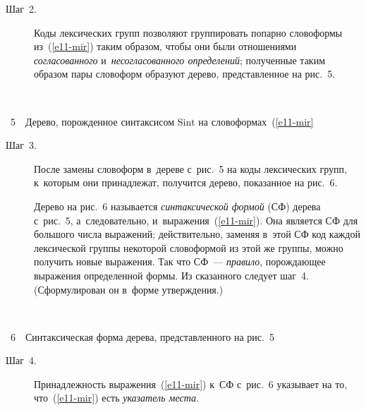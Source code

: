 \begin{multicols}{2}
\begin{description}
     

     
    \item[Шаг~2.] Коды лексических групп позволяют группировать попарно 
словоформы из~(\ref{e11-mir}) таким образом, чтобы они были отношениями 
\textit{согласованного} и~\textit{несогласованного определений}; полученные таким 
образом пары словоформ образуют дерево, представленное на рис.~5.
\end{description}

{ \begin{center}  %
 \vspace*{9pt}
  \mbox{%
 \epsfxsize=68.512mm 
 }


\end{center}


\noindent
{{\figurename~5}\ \ \small{Дерево, порожденное синтаксисом $\mathrm{Sint}$ на словоформах~(\ref{e11-mir}}}
}

\vspace*{9pt}      

     
     
     
 \begin{description}    
     \item[Шаг~3.] После замены словоформ в~дереве с~рис.~5 на коды лексических 
групп, к~которым они принадлежат, получится дерево, показанное на рис.~6.
     

     
     Дерево на рис.~6 называется \textit{синтаксической формой} (СФ) дерева 
с~рис.~5, а~следовательно, и~выражения~(\ref{e11-mir}). Она является СФ для 
большого чис\-ла выражений; действительно, заменяя в~этой СФ код каждой 
лексической группы некоторой словоформой из этой же группы, можно получить 
новые выражения. Так что СФ~--- \textit{правило}, порождающее выражения 
определенной формы. Из сказанного следует шаг~4. (Сформулирован он в~форме 
утверж\-де\-ния.) 
\end{description}

{ \begin{center}  %
 \vspace*{9pt}
  \mbox{%
 \epsfxsize=68.512mm 
 }


\end{center}


\noindent
{{\figurename~6}\ \ \small{Синтаксическая форма дерева, представленного на рис.~5}}
}
    
    \vspace*{6pt}
     
     
\begin{description}
     \item[Шаг~4.] При\-над\-леж\-ность выражения~(\ref{e11-mir}) к~СФ с~рис.~6 
указывает на то, что~(\ref{e11-mir}) есть \textit{указатель места}. 
\end{description}
     

\end{multicols}
